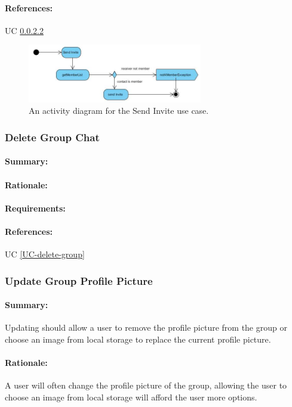 \documentclass[11pt]{article}
\begin{document}
\paragraph{References:} UC \ref{}
 \begin{figure}[H]
 \centering
 \includegraphics[width=3in]{./images/process-sendInvite.jpg}
 \caption[Send Invite Activity Diagram]{An activity diagram for the Send Invite use case.}
 \label{FR-figure-send-invite}
 \end{figure}
 
\subsubsection{Delete Group Chat} \label{FR-delete-group}
\paragraph{Summary:}
\paragraph{Rationale:}
\paragraph{Requirements:}
\paragraph{References:} UC \ref{UC-delete-group}

\subsubsection{Update Group Profile Picture} \label{FR-update-group-picture}
\paragraph{Summary:}
Updating should allow a user to remove the profile picture from the group or choose an image from local storage to replace the current profile picture.
\paragraph{Rationale:}
A user will often change the profile picture of the group, allowing the user to choose an image from local storage will afford the user more options.
\end{document}
